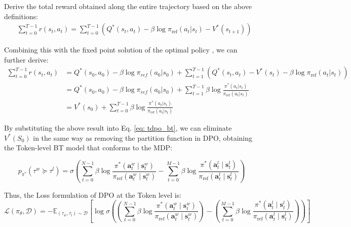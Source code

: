 Derive the total reward obtained along the entire trajectory based on the above definitions:
\begin{align}
& \sum_{t=0}^{T-1} r(s_t, a_t)
 = \sum_{t=0}^{T-1} ( Q^*(s_t, a_t) - \beta \log \pi_{\text{ref}}(a_t | s_t) - V^*(s_{t+1}) )
\label{eq: r_sum}
\end{align}

Combining this with the fixed point solution of the optimal policy \cite{Ziebart2010ModelingPA, Levine2018ReinforcementLA}, we can further derive:
\begin{align}
\sum_{t=0}^{T-1} r(s_t, a_t)
& = Q^*(s_0, a_0) - \beta \log \pi_{ref}(a_0 | s_0) 
+ \sum_{t=1}^{T-1} ( Q^*(s_t, a_t) - V^*(s_t) - \beta \log \pi_{\text{ref}}(a_t | s_t) )
\\
& = Q^*(s_0, a_0) - \beta \log \pi_{ref}(a_0 | s_0) + \sum_{t=1}^{T-1} \beta \log \frac{\pi^*(a_t | s_t)}{\pi_{\text{ref}}(a_t | s_t)}
\\
& = V^*(s_0) + \sum_{t=0}^{T-1} \beta \log \frac{\pi^*(a_t | s_t)}{\pi_{\text{ref}}(a_t | s_t)}
\end{align}

By substituting the above result into Eq. \ref{eq: tdpo_bt}, we can eliminate $V^*(S_0)$ in the same way as removing the partition function in DPO, obtaining the Token-level BT model that conforms to the MDP:

\begin{equation}
p_{\pi^*}\left(\tau^w \succeq \tau^l\right)=\sigma\left(\sum_{t=0}^{N-1} \beta \log \frac{\pi^*\left(\mathbf{a}_t^w \mid \mathbf{s}_t^w\right)}{\pi_{\mathrm{ref}}\left(\mathbf{a}_t^w \mid \mathbf{s}_t^w\right)}-\sum_{t=0}^{M-1} \beta \log \frac{\pi^*\left(\mathbf{a}_t^l \mid \mathbf{s}_t^l\right)}{\pi_{\mathrm{ref}}\left(\mathbf{a}_t^l \mid \mathbf{s}_t^l\right)}\right)
\end{equation}

Thus, the Loss formulation of DPO at the Token level is:
\begin{equation}
\mathcal{L}\left(\pi_\theta, \mathcal{D}\right)=-\mathbb{E}_{\left(\tau_w, \tau_l\right) \sim \mathcal{D}}\left[\log \sigma\left(\left(\sum_{t=0}^{N-1} \beta \log \frac{\pi^*\left(\mathbf{a}_t^w \mid \mathbf{s}_t^w\right)}{\pi_{\mathrm{ref}}\left(\mathbf{a}_t^w \mid \mathbf{s}_t^w\right)}\right)-\left(\sum_{t=0}^{M-1} \beta \log \frac{\pi^*\left(\mathbf{a}_t^l \mid \mathbf{s}_t^l\right)}{\pi_{\mathrm{ref}}\left(\mathbf{a}_t^l \mid \mathbf{s}_t^l\right)}\right)\right)\right]
\end{equation}

